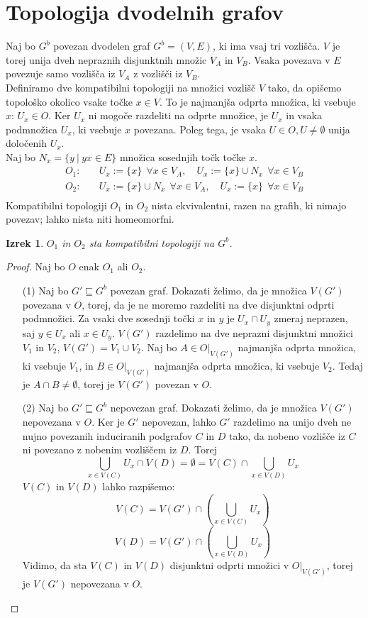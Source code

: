 \documentclass[a4paper, 12pt]{book}
\newtheorem{theorem}{Izrek}[section]
\theoremstyle{definition}
\begin{document}
\section{Topologija dvodelnih grafov}
Naj bo $G^b$ povezan dvodelen graf $G^b = (V,E)$, ki ima vsaj tri vozlišča.
$V$ je torej unija dveh nepraznih disjunktnih množic $V_A$ in $V_B$. Vsaka
povezava v $E$ povezuje samo vozlišča iz $V_A$ z vozlišči iz $V_B$.\\
Definiramo dve kompatibilni topologiji na množici vozlišč $V$ tako, da opišemo
topološko okolico vsake točke $x \in V$. To je najmanjša odprta množica, ki
vsebuje $x$: $U_x \in O$. Ker $U_x$ ni mogoče razdeliti na odprte množice, je $U_x$
in vsaka podmnožica $U_x$, ki vsebuje $x$ povezana.
Poleg tega, je vsaka $U \in O, U \neq \emptyset$ unija določenih $U_x$.\\
Naj bo $N_x = \{y \  | \  yx \in E\}$ množica sosednjih točk točke $x$.\\
\[
  \begin{split}
  O_1:&\quad
  U_x:=\{x\}\ \ \forall x \in V_A, \quad
  U_x:=\{x\}\cup N_x\ \  \forall x \in V_B\\
  O_2:&\quad
  U_x:=\{x\}\cup N_x\ \  \forall x \in V_A, \quad
  U_x:=\{x\}\ \ \forall x \in V_B\\
\end{split}
\]
Kompatibilni topologiji $O_1$ in $O_2$ nista ekvivalentni, razen na grafih,
ki nimajo povezav; lahko nista niti homeomorfni.
\begin{theorem}
  $O_1$ in $O_2$ sta kompatibilni topologiji na $G^b$.
\end{theorem}
\begin{proof}
  Naj bo $O$ enak $O_1$ ali $O_2$.
  \begin{itemize}
    \item[(1)] Naj bo $G' \sqsubseteq G^b$ povezan graf. Dokazati želimo, da je
    množica $V(G')$ povezana v $O$, torej, da je ne moremo razdeliti na dve
    disjunktni odprti podmnožici. Za vsaki dve sosednji točki $x$ in $y$ je
    $U_x \cap U_y$ zmeraj neprazen, saj $y \in U_x$ ali $x \in U_y$. $V(G')$
    razdelimo na dve neprazni disjunktni množici $V_1$ in $V_2$,
    $V(G') = V_1 \cup V_2$. Naj bo $A \in O|_{V(G')}$
    najmanjša odprta množica, ki vsebuje $V_1$, in $B \in O|_{V(G')}$
    najmanjša odprta množica, ki vsebuje $V_2$. Tedaj je $A \cap B \neq \emptyset$,
    torej je $V(G')$ povezan v $O$.
    \item[(2)] Naj bo $G' \sqsubseteq G^b$ nepovezan graf. Dokazati želimo, da
    je množica $V(G')$ nepovezana v $O$. Ker je $G'$ nepovezan, lahko $G'$ razdelimo
    na unijo dveh ne nujno povezanih induciranih podgrafov $C$ in $D$ tako, da nobeno vozlišče iz $C$
    ni povezano z nobenim vozliščem iz $D$. Torej
    \[\bigcup_{x\in V(C)}U_x \cap V(D) = \emptyset = V(C) \cap \bigcup_{x\in V(D)}U_x\]
    $V(C)$ in $V(D)$ lahko razpišemo:
    \[V(C) = V(G') \cap \left(\bigcup_{x\in V(C)} U_x\right)\]
    \[V(D) = V(G') \cap \left(\bigcup_{x\in V(D)} U_x\right)\]
    Vidimo, da sta $V(C)$ in $V(D)$ disjunktni odprti množici v $O|_{V(G')}$,
    torej je $V(G')$ nepovezana v $O$.
  \end{itemize}
\end{proof}
\end{document}

